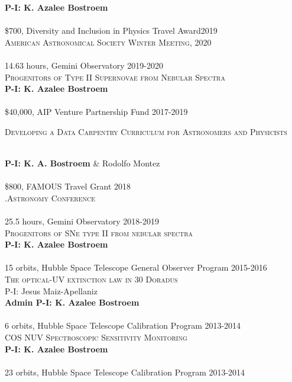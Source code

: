\documentclass[10pt]{cv}
\begin{document}
\begin{llist}
\textbf{P-I: K. Azalee Bostroem}\\
\\   
\$700, Diversity and Inclusion in Physics Travel Award\hfill 2019\\
\textsc{American Astronomical Society Winter Meeting, 2020}\\
\\
14.63 hours, Gemini Observatory \hfill 2019-2020\\
\textsc{Progenitors of Type II Supernovae from Nebular Spectra}\\
\textbf{P-I: K. Azalee Bostroem}\\
\\
\$40,000, AIP Venture Partnership Fund \hfill 2017-2019\\
\begin{minipage}[l]{0.7\textwidth}\vspace{0.15cm}
\textsc{Developing a Data Carpentry Curriculum for Astronomers and Physicists}
\end{minipage}\vspace{0.15cm}\\
{\bf P-I: K. A. Bostroem} \& Rodolfo Montez\\
\\
\$800, FAMOUS Travel Grant \hfill2018\\ 
\textsc{.Astronomy Conference}\\
\\
25.5 hours, Gemini Observatory \hfill 2018-2019\\
\textsc{Progenitors of SNe type II from nebular spectra}\\
{\bf P-I: K. Azalee Bostroem} \\
\\
15 orbits, Hubble Space Telescope General Observer Program \hfill 2015-2016\\ %
\textsc{The optical-UV extinction law in 30 Doradus}\\
P-I: Jesus Maiz-Apellaniz \\
{\bf Admin P-I: K. Azalee Bostroem} \\
\\
6 orbits, Hubble Space Telescope Calibration Program \hfill 2013-2014\\ %
\textsc{COS NUV Spectroscopic Sensitivity Monitoring}\\
{\bf P-I: K. Azalee Bostroem} \\ %
\\
23 orbits, Hubble Space Telescope Calibration Program \hfill 2013-2014\\ %

\end{llist}
\end{document}
